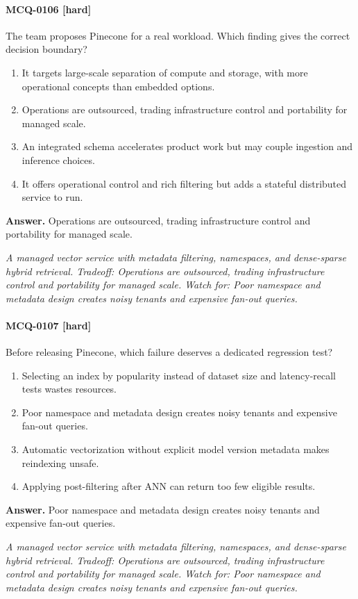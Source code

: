 \paragraph{MCQ-0106 [hard]} The team proposes Pinecone for a real workload. Which finding gives the correct decision boundary?
\begin{enumerate}[label=\Alph*.]
\item It targets large-scale separation of compute and storage, with more operational concepts than embedded options.
\item Operations are outsourced, trading infrastructure control and portability for managed scale.
\item An integrated schema accelerates product work but may couple ingestion and inference choices.
\item It offers operational control and rich filtering but adds a stateful distributed service to run.
\end{enumerate}
\noindent\textbf{Answer.} Operations are outsourced, trading infrastructure control and portability for managed scale.
\par\textit{A managed vector service with metadata filtering, namespaces, and dense-sparse hybrid retrieval. Tradeoff: Operations are outsourced, trading infrastructure control and portability for managed scale. Watch for: Poor namespace and metadata design creates noisy tenants and expensive fan-out queries.}
\paragraph{MCQ-0107 [hard]} Before releasing Pinecone, which failure deserves a dedicated regression test?
\begin{enumerate}[label=\Alph*.]
\item Selecting an index by popularity instead of dataset size and latency-recall tests wastes resources.
\item Poor namespace and metadata design creates noisy tenants and expensive fan-out queries.
\item Automatic vectorization without explicit model version metadata makes reindexing unsafe.
\item Applying post-filtering after ANN can return too few eligible results.
\end{enumerate}
\noindent\textbf{Answer.} Poor namespace and metadata design creates noisy tenants and expensive fan-out queries.
\par\textit{A managed vector service with metadata filtering, namespaces, and dense-sparse hybrid retrieval. Tradeoff: Operations are outsourced, trading infrastructure control and portability for managed scale. Watch for: Poor namespace and metadata design creates noisy tenants and expensive fan-out queries.}
